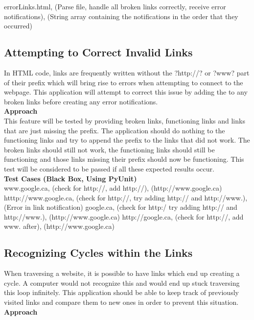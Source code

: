 \documentclass[12pt, titlepage]{article}
\begin{document}
errorLinks.html, (Parse file, handle all broken links correctly, receive error notifications), (String array containing the notifications in the order that they occurred)

\subsection{Attempting to Correct Invalid Links}
In HTML code, links are frequently written without the ?http://? or ?www? part of their prefix which will bring rise to errors when attempting to connect to the webpage. This application will attempt to correct this issue by adding the to any broken links before creating any error notifications.\\

\textbf{Approach}\\
This feature will be tested by providing broken links, functioning links and links that are just missing the prefix. The application should do nothing to the functioning links and try to append the prefix to the links that did not work. The broken links should still not work, the functioning links should still be functioning and those links missing their prefix should now be functioning. This test will be considered to be passed if all these expected results occur.\\

\textbf{Test Cases (Black Box, Using PyUnit)}\\

www.google.ca, (check for http://, add http://), (http://www.google.ca)
htttp://www.google.ca, (check for http://, try adding http:// and http://www.), (Error in link notification)
google.ca, (check for http:/ try adding http:// and http://www.), (http://www.google.ca)
http://google.ca, (check for http://, add www. after), (http://www.google.ca)

\subsection{Recognizing Cycles within the Links}
When traversing a website, it is possible to have links which end up creating a cycle. A computer would not recognize this and would end up stuck traversing this loop infinitely. This application should be able to keep track of previously visited links and compare them to new ones in order to prevent this situation.\\

\textbf{Approach}\\
\end{document}
